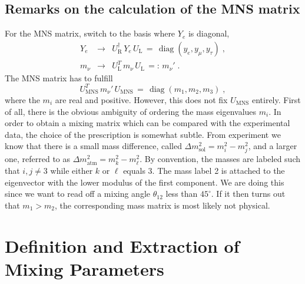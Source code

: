 \documentclass[12pt,a4paper,twoside]{scrartcl}
\DeclareMathOperator{\diag}{diag}
\numberwithin{equation}{section}
\numberwithin{table}{section}
\begin{document}
\subsection{Remarks on the calculation of the MNS matrix}

For the MNS matrix, switch to the basis where $Y_e$ is diagonal,
\begin{subequations}
\begin{eqnarray}
 Y_e & \to & U_\mathrm{R}^\dagger\,Y_e\,U_\mathrm{L} 
 \,=\,\diag(y_e,y_\mu,y_\tau)\;,\\
 m_\nu & \to & U_\mathrm{L}^T\,m_\nu\,U_\mathrm{L}
 \,=:\,m_\nu'\;.
\end{eqnarray}
\end{subequations} 
The MNS matrix has to fulfill
\begin{equation}
 U_\mathrm{MNS}^T\,m_\nu'\,U_\mathrm{MNS}
 \,=\,
 \diag(m_1,m_2,m_3)\;,
\end{equation}
where the $m_i$ are real and positive. However, this does not fix
$U_\mathrm{MNS}$ entirely. First of all, there is the obvious ambiguity of
ordering the mass eigenvalues $m_i$. In order to obtain a mixing matrix which
can be compared with the experimental data,  the choice of the prescription is
somewhat subtle. From experiment we know that there is a small mass difference,
called $\Delta m^2_\mathrm{sol}=m_i^2-m_j^2$, and a larger one, referred to as 
$\Delta m^2_\mathrm{atm}=m_k^2 - m_\ell^2$. By convention, the masses are
labeled such that $i,j\ne 3$ while either $k$ or $\ell$ equals 3.  The mass
label 2 is attached to the eigenvector with the lower modulus of the first
component. We are doing this since we want to read off a mixing angle
$\theta_{12}$ less than $45^\circ$. If it then turns out that $m_1>m_2$, the
corresponding mass matrix is most likely not physical.


\section{Definition and Extraction of Mixing Parameters}
\label{app:MixingParameters}
\end{document}
